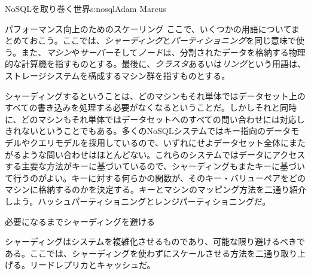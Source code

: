 \begin{aosachapter}{NoSQLを取り巻く世界}{s:nosql}{Adam Marcus}
\begin{aosasect1}{パフォーマンス向上のためのスケーリング}
ここで、いくつかの用語についてまとめておこう。ここでは、\emph{シャーディング}と\emph{パーティショニング}を同じ意味で使う。また、\emph{マシン}や\emph{サーバー}そして\emph{ノード}は、分割されたデータを格納する物理的な計算機を指すものとする。最後に、\emph{クラスタ}あるいは\emph{リング}という用語は、ストレージシステムを構成するマシン群を指すものとする。

シャーディングするということは、どのマシンもそれ単体ではデータセット上のすべての書き込みを処理する必要がなくなるということだ。しかしそれと同時に、どのマシンもそれ単体ではデータセットへのすべての問い合わせには対応しきれないということでもある。多くのNoSQLシステムではキー指向のデータモデルやクエリモデルを採用しているので、いずれにせよデータセット全体にまたがるような問い合わせはほとんどない。これらのシステムではデータにアクセスする主要な方法がキーに基づいているので、シャーディングもまたキーに基づいて行うのがよい。キーに対する何らかの関数が、そのキー・バリューペアをどのマシンに格納するのかを決定する。キーとマシンのマッピング方法を二通り紹介しよう。ハッシュパーティショニングとレンジパーティショニングだ。

\begin{aosasect2}{必要になるまでシャーディングを避ける}

シャーディングはシステムを複雑化させるものであり、可能な限り避けるべきである。ここでは、シャーディングを使わずにスケールさせる方法を二通り取り上げる。リードレプリカとキャッシュだ。


\end{aosasect2}
\end{aosasect1}
\end{aosachapter}
